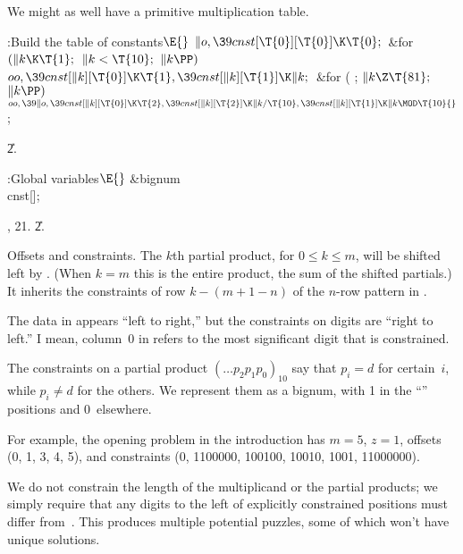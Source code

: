 We might as well have a primitive
multiplication table.

\Y\B\4:Build the table of constants\X${}\E{}$\6
$\|o,\39\\{cnst}[\T{0}][\T{0}]\K\T{0};{}$\6
\&{for} ${}(\|k\K\T{1};{}$ ${}\|k<\T{10};{}$ ${}\|k\PP){}$\1\5
${}\\{oo},\39\\{cnst}[\|k][\T{0}]\K\T{1},\39\\{cnst}[\|k][\T{1}]\K\|k;{}$\2\6
\&{for} ( ; ${}\|k\Z\T{81};{}$ ${}\|k\PP){}$\1\5
${}\\{oo},\39\|o,\39\\{cnst}[\|k][\T{0}]\K\T{2},\39\\{cnst}[\|k][\T{2}]\K\|k/%
\T{10},\39\\{cnst}[\|k][\T{1}]\K\|k\MOD\T{10}{}$;\2\par
\U2.\fi

\B{}:Global variables\X${}\E{}$\6
\&{bignum} \\{cnst}[];\par
{}, 21.
\U2.\fi

Offsets and constraints.
The $k$th partial product, for $0\le k\le m$, will be shifted left
by . (When $k=m$ this is the entire product, the sum of the
shifted partials.) It inherits the constraints of row $k-(m+1-n)$ of
the $n$-row pattern in .

The data in  appears ``left to right,'' but the constraints
on digits are ``right to left.'' I mean, column~0 in  refers
to the most significant digit that is constrained.

The constraints on a partial product $({}\ldots p_2p_1p_0)_{10}$ say that
$p_i=d$ for certain~$i$, while $p_i\ne d$ for the others. We represent
them as a bignum, with 1 in the ``'' positions and 0~elsewhere.

For example, the opening problem in the introduction has $m=5$, $z=1$,
offsets (0, 1, 3, 4, 5), and constraints
(0, 1100000, 100100, 10010, 1001, 11000000).

We do not constrain the length of the multiplicand or the partial products;
we simply require that any digits to the left of explicitly
constrained positions must differ from~. This produces multiple
potential puzzles, some of which won't have unique solutions.

